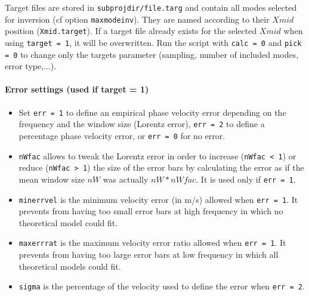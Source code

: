 \documentclass[twoside,a4paper]{article}
\begin{document}
Target files are stored in \verb|subprojdir/file.targ| and contain all modes selected for inversion (cf option \verb|maxmodeinv|). They are named according to their $Xmid$ position (\verb|Xmid.target|). If a target file already exists for the selected $Xmid$ when using \verb|target = 1|, it will be overwritten. Run the script with \verb|calc = 0| and \verb|pick = 0| to change only the targets parameter (sampling, number of included modes, error type,...).

\paragraph{Error settings (used if target = 1)}
\begin{itemize}[leftmargin=*]
\setlength\itemsep{2ex}
\item Set \verb|err = 1| to define an empirical phase velocity error depending on the frequency and the window size (Lorentz error), \verb|err = 2| to define a percentage phase velocity error, or \verb|err = 0| for no error.

\item \verb|nWfac| allows to tweak the Lorentz error in order to increase (\verb|nWfac < 1|) or reduce (\verb|nWfac > 1|) the size of the error bars by calculating the error as if the mean window size $nW$ was actually $nW*nWfac$. It is used only if \verb|err = 1|.

\item \verb|minerrvel| is the minimum velocity error (in m/s) allowed when \verb|err = 1|. It prevents from having too small error bars at high frequency in which no theoretical model could fit.

\item \verb|maxerrrat| is the maximum velocity error ratio allowed when \verb|err = 1|. It prevents from having too large error bars at low frequency in which all theoretical models could fit.

\item \verb|sigma| is the percentage of the velocity used to define the error when \verb|err = 2|.
\end{itemize}
\end{document}
